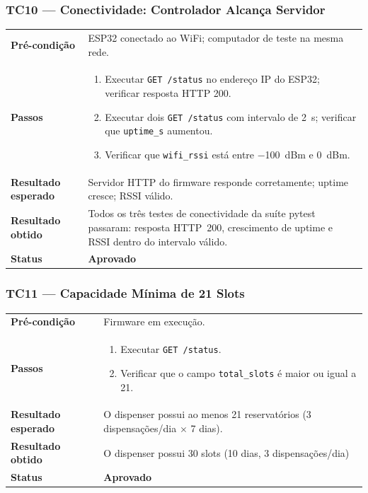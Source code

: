 \documentclass[12pt,a4paper]{article}
\newcommand{\lightrule}{\arrayrulecolor{gray!35}\midrule\arrayrulecolor{black}}
\newcommand{\aprovado}{\textcolor{green!60!black}{\textbf{Aprovado}}}
\begin{document}
\subsubsection{TC10 — Conectividade: Controlador Alcança Servidor}
\begin{table}[H]\small\setlength{\tabcolsep}{6pt}\renewcommand{\arraystretch}{1.3}
\begin{tabularx}{\textwidth}{>{\bfseries}p{4cm} X}
\toprule
Pré-condição & ESP32 conectado ao WiFi; computador de teste na mesma rede. \\
\lightrule
Passos &
\begin{enumerate}[nosep,leftmargin=*]
  \item Executar \texttt{GET /status} no endereço IP do ESP32; verificar resposta HTTP 200.
  \item Executar dois \texttt{GET /status} com intervalo de 2~s; verificar que \texttt{uptime\_s} aumentou.
  \item Verificar que \texttt{wifi\_rssi} está entre $-$100~dBm e 0~dBm.
\end{enumerate} \\
\lightrule
Resultado esperado & Servidor HTTP do firmware responde corretamente; uptime cresce; RSSI válido. \\
\lightrule
Resultado obtido & Todos os três testes de conectividade da suíte pytest passaram: resposta HTTP~200, crescimento de uptime e RSSI dentro do intervalo válido. \\
\lightrule
Status & \aprovado \\
\bottomrule
\end{tabularx}\end{table}

\subsubsection{TC11 — Capacidade Mínima de 21 Slots}
\begin{table}[H]\small\setlength{\tabcolsep}{6pt}\renewcommand{\arraystretch}{1.3}
\begin{tabularx}{\textwidth}{>{\bfseries}p{4cm} X}
\toprule
Pré-condição & Firmware em execução. \\
\lightrule
Passos &
\begin{enumerate}[nosep,leftmargin=*]
  \item Executar \texttt{GET /status}.
  \item Verificar que o campo \texttt{total\_slots} é maior ou igual a 21.
\end{enumerate} \\
\lightrule
Resultado esperado & O dispenser possui ao menos 21 reservatórios (3 dispensações/dia $\times$ 7 dias). \\
\lightrule
Resultado obtido & O dispenser possui 30 slots (10 dias, 3 dispensações/dia) \\
\lightrule
Status & \aprovado \\
\bottomrule
\end{tabularx}\end{table}
\end{document}
